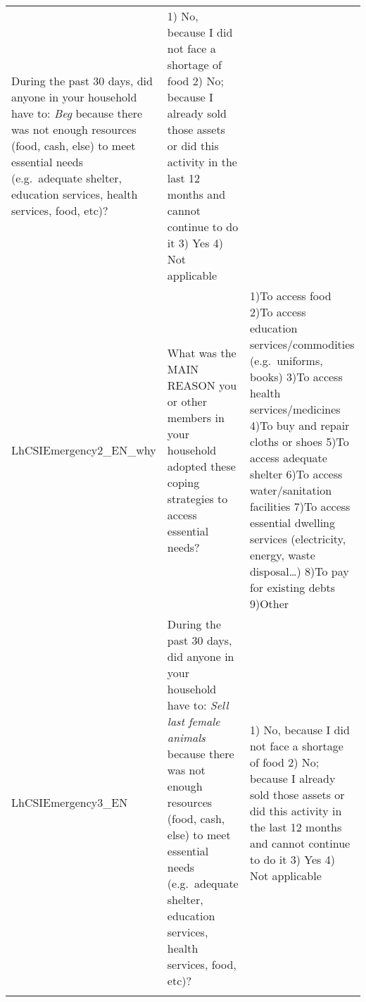 \documentclass[
]{book}
\begin{document}
\begin{longtable}[]{@{}lll@{}}
\begin{minipage}[t]{0.37\columnwidth}
During the past 30 days, did anyone in your household have to: \emph{Beg} because there was not enough resources (food, cash, else) to meet essential needs (e.g.~adequate shelter, education services, health services, food, etc)?\strut
\end{minipage} & \begin{minipage}[t]{0.43\columnwidth}\raggedright
1) No, because I did not face a shortage of food 2) No; because I already sold those assets or did this activity in the last 12 months and cannot continue to do it 3) Yes 4) Not applicable\strut
\end{minipage}\tabularnewline
\begin{minipage}[t]{0.11\columnwidth}\raggedright
LhCSIEmergency2\_EN\_why\strut
\end{minipage} & \begin{minipage}[t]{0.37\columnwidth}\raggedright
What was the MAIN REASON you or other members in your household adopted these coping strategies to access essential needs?\strut
\end{minipage} & \begin{minipage}[t]{0.43\columnwidth}\raggedright
1)To access food 2)To access education services/commodities (e.g.~uniforms, books) 3)To access health services/medicines 4)To buy and repair cloths or shoes 5)To access adequate shelter 6)To access water/sanitation facilities 7)To access essential dwelling services (electricity, energy, waste disposal\ldots) 8)To pay for existing debts 9)Other\strut
\end{minipage}\tabularnewline
\begin{minipage}[t]{0.11\columnwidth}\raggedright
LhCSIEmergency3\_EN\strut
\end{minipage} & \begin{minipage}[t]{0.37\columnwidth}\raggedright
During the past 30 days, did anyone in your household have to: \emph{Sell last female animals} because there was not enough resources (food, cash, else) to meet essential needs (e.g.~adequate shelter, education services, health services, food, etc)?\strut
\end{minipage} & \begin{minipage}[t]{0.43\columnwidth}\raggedright
1) No, because I did not face a shortage of food 2) No; because I already sold those assets or did this activity in the last 12 months and cannot continue to do it 3) Yes 4) Not applicable\strut
\end{minipage}\tabularnewline
\begin{minipage}[t]{0.11\columnwidth}\raggedright

\end{minipage}
\end{longtable}
\end{document}
